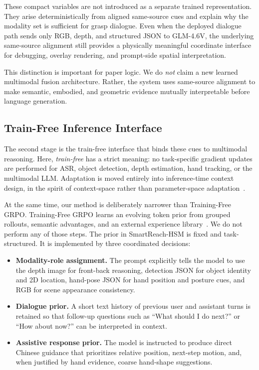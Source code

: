 \documentclass[10pt,twocolumn,letterpaper]{article}
\begin{document}
These compact variables are not introduced as a separate trained representation. They arise deterministically from aligned same-source cues and explain why the modality set is sufficient for grasp dialogue. Even when the deployed dialogue path sends only RGB, depth, and structured JSON to GLM-4.6V, the underlying same-source alignment still provides a physically meaningful coordinate interface for debugging, overlay rendering, and prompt-side spatial interpretation.

This distinction is important for paper logic. We do \emph{not} claim a new learned multimodal fusion architecture. Rather, the system uses same-source alignment to make semantic, embodied, and geometric evidence mutually interpretable before language generation.

\subsection{Train-Free Inference Interface}
The second stage is the train-free interface that binds these cues to multimodal reasoning. Here, \emph{train-free} has a strict meaning: no task-specific gradient updates are performed for ASR, object detection, depth estimation, hand tracking, or the multimodal LLM. Adaptation is moved entirely into inference-time context design, in the spirit of context-space rather than parameter-space adaptation~\cite{cai2025tfgrpo}.

At the same time, our method is deliberately narrower than Training-Free GRPO. Training-Free GRPO learns an evolving token prior from grouped rollouts, semantic advantages, and an external experience library~\cite{cai2025tfgrpo}. We do not perform any of those steps. The prior in SmartReach-HSM is fixed and task-structured. It is implemented by three coordinated decisions:
\begin{itemize}
    \item \textbf{Modality-role assignment.} The prompt explicitly tells the model to use the depth image for front-back reasoning, detection JSON for object identity and 2D location, hand-pose JSON for hand position and posture cues, and RGB for scene appearance consistency.
    \item \textbf{Dialogue prior.} A short text history of previous user and assistant turns is retained so that follow-up questions such as ``What should I do next?'' or ``How about now?'' can be interpreted in context.
    \item \textbf{Assistive response prior.} The model is instructed to produce direct Chinese guidance that prioritizes relative position, next-step motion, and, when justified by hand evidence, coarse hand-shape suggestions.
\end{itemize}
\end{document}
